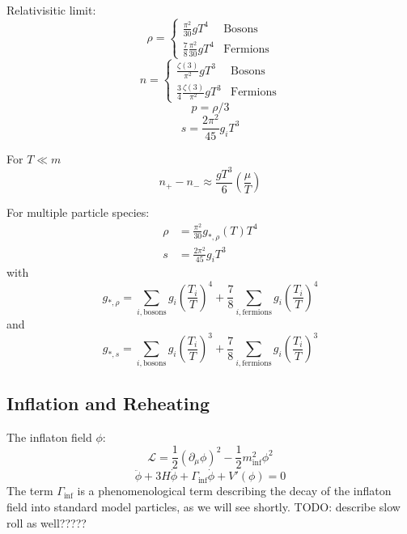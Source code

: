 \documentclass[master,       %
               twoside,        %
               BCOR10mm,       %
               english,ngerman, %
               ]{GAUBM}
\begin{document}
\begin{otherlanguage}{english}
Relativisitic limit:
\begin{equation}
	\rho = \begin{cases} 
		\frac{\pi^2}{30} g T^4 & \text{Bosons} \\
		\frac{7}{8} \frac{\pi^2}{30} g T^4 & \text{Fermions}
	\end{cases}
\end{equation}
\begin{equation}
	n = \begin{cases} 
		\frac{\zeta(3)}{\pi^2} g T^3 & \text{Bosons} \\
		\frac{3}{4} \frac{\zeta(3)}{\pi^2} g T^3 & \text{Fermions}
	\end{cases}
\end{equation}
\begin{equation}
	p = \rho / 3
\end{equation}
\begin{equation}
	s = \frac{2 \pi^2}{45} g_i T^3
\end{equation}

For $T \ll m$
\begin{equation}
	n_+ - n_- \approx \frac{g T^3}{6} \left( \frac{\mu}{T} \right)
\end{equation}

For multiple particle species:
\begin{align}
	\rho &= \frac{\pi^2}{30} g_{*, \rho}(T) T^4 \nonumber \\
	s &= \frac{2 \pi^2}{45} g_i T^3
\end{align}
with 
\begin{equation}
	g_{*, \rho} = \sum_{i, \text{bosons}} g_i \left( \frac{T_i}{T} \right)^4 + \frac{7}{8} \sum_{i, \text{fermions}} g_i \left( \frac{T_i}{T} \right)^4
\end{equation}
and
\begin{equation}
	g_{*, s} = \sum_{i, \text{bosons}} g_i \left( \frac{T_i}{T} \right)^3 + \frac{7}{8} \sum_{i, \text{fermions}} g_i \left( \frac{T_i}{T} \right)^3
\end{equation}

\subsection{Inflation and Reheating}
The inflaton field $\phi$:
\begin{equation}
	\mathcal{L} = \frac{1}{2} (\partial_\mu \phi)^2 - \frac{1}{2} m_\mathrm{inf}^2 \phi^2
\end{equation}
\begin{equation}
	\label{eq:inflaton_field_eq}
	\ddot{\phi} + 3 H \dot{\phi} + \Gamma_\mathrm{inf} \dot{\phi} + V'(\phi) = 0
\end{equation}
The term $\Gamma_\mathrm{inf}$ is a phenomenological term describing the decay of the inflaton field into standard model particles, as we will see shortly.
TODO: describe slow roll as well?????


\end{otherlanguage}
\end{document}
